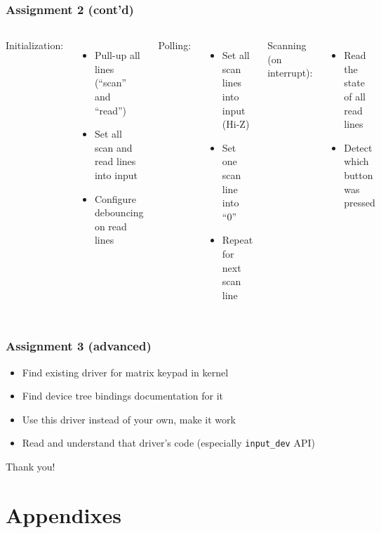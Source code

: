 \begin{frame}
  \frametitle{Assignment 2 (cont'd)}
  \begin{columns}
      Initialization:
      \begin{itemize}
        \item Pull-up all lines (``scan'' and ``read'')
        \item Set all scan and read lines into input
        \item Configure debouncing on read lines
      \end{itemize}
      Polling:
      \begin{itemize}
        \item Set all scan lines into input (Hi-Z)
        \item Set one scan line into ``0''
        \item Repeat for next scan line
      \end{itemize}
      Scanning (on interrupt):
      \begin{itemize}
        \item Read the state of all read lines
        \item Detect which button was pressed
      \end{itemize}
  \end{columns}
\end{frame}

\begin{frame}
  \frametitle{Assignment 3 (advanced)}
  \begin{itemize}
    \item Find existing driver for matrix keypad in kernel
    \item Find device tree bindings documentation for it
    \item Use this driver instead of your own, make it work
    \item Read and understand that driver's code (especially
          \texttt{input\_dev} API)
  \end{itemize}
\end{frame}

\begin{frame}[standout]
  Thank you!
\end{frame}

\section{Appendixes}

